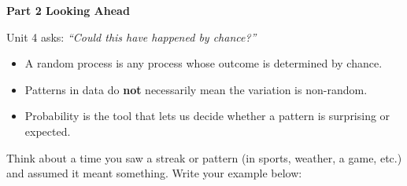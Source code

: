 \documentclass[10pt]{article}
\begin{document}
\vspace{0.35in}

{\large\bfseries\color{navy} Part 2 \quad Looking Ahead}

\vspace{0.12in}

\noindent Unit 4 asks: \textit{``Could this have happened by chance?''}

\vspace{0.14in}

\begin{tcolorbox}[colback=greenbg, colframe=greenacc, boxrule=0.8pt, arc=2mm,
    left=4mm, right=4mm, top=3mm, bottom=3mm]
    \small
    \begin{itemize}[leftmargin=1.3em, itemsep=8pt]
  \item A random process is any process whose outcome is determined by chance.
  \item Patterns in data do \textbf{not} necessarily mean the variation is non-random.
  \item Probability is the tool that lets us decide whether a pattern is surprising or expected.
    \end{itemize}
\end{tcolorbox}

\vspace{0.2in}

\noindent\textcolor{slate}{\small Think about a time you saw a streak or pattern (in sports, weather,
a game, etc.) and assumed it meant something. Write your example below:}\\[8pt]
\writeline\\[2pt]\writeline
\end{document}
